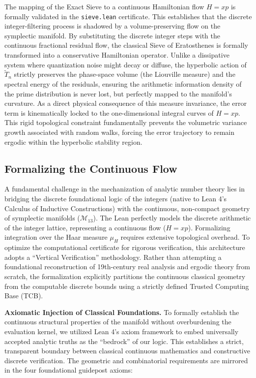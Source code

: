\documentclass[sn-mathphys-num, pdflatex, referee]{sn-jnl}
\begin{document}
The mapping of the Exact Sieve to a continuous Hamiltonian flow $H=xp$ is formally validated in the \texttt{sieve.lean} certificate. This establishes that the discrete integer-filtering process is shadowed by a volume-preserving flow on the symplectic manifold. By substituting the discrete integer steps with the continuous fractional residual flow, the classical Sieve of Eratosthenes is formally transformed into a conservative Hamiltonian operator. Unlike a dissipative system where quantization noise might decay or diffuse, the hyperbolic action of $\tilde{T}_n$ strictly preserves the phase-space volume (the Liouville measure) and the spectral energy of the residuals, ensuring the arithmetic information density of the prime distribution is never lost, but perfectly mapped to the manifold's curvature. As a direct physical consequence of this measure invariance, the error term is kinematically locked to the one-dimensional integral curves of $H=xp$. This rigid topological constraint fundamentally prevents the volumetric variance growth associated with random walks, forcing the error trajectory to remain ergodic within the hyperbolic stability region.

\subsection{Formalizing the Continuous Flow}
\label{sec:epistemology}

A fundamental challenge in the mechanization of analytic number theory lies in bridging the discrete foundational logic of the integers (native to Lean 4's Calculus of Inductive Constructions) with the continuous, non-compact geometry of symplectic manifolds ($\mathcal{M}_{13}$). The Lean perfectly models the discrete arithmetic of the integer lattice, representing a continuous flow ($H=xp$). Formalizing integration over the Haar measure $\mu_H$ requires extensive topological overhead. To optimize the computational certificate for rigorous verification, this architecture adopts a ``Vertical Verification'' methodology. Rather than attempting a foundational reconstruction of 19th-century real analysis and ergodic theory from scratch, the formalization explicitly partitions the continuous classical geometry from the computable discrete bounds using a strictly defined Trusted Computing Base (TCB).

\textbf{Axiomatic Injection of Classical Foundations.}
To formally establish the continuous structural properties of the manifold without overburdening the evaluation kernel, we utilized Lean 4's axiom framework to embed universally accepted analytic truths as the ``bedrock'' of our logic. This establishes a strict, transparent boundary between classical continuous mathematics and constructive discrete verification. The geometric and combinatorial requirements are mirrored in the four foundational guidepost axioms:
\end{document}
